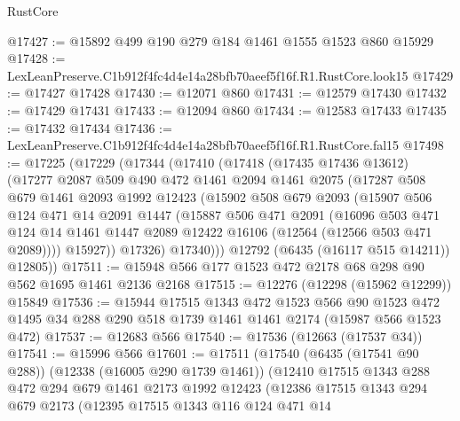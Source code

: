 \begin{lexlean}{RustCore}
\begin{coremodule}
@17427 := @15892 @499 @190 @279 @184 @1461 @1555 @1523 @860 @15929
@17428 := LexLeanPreserve.C1b912f4fc4d4e14a28bfb70aeef5f16f.R1.RustCore.look15
@17429 := @17427 @17428
@17430 := @12071 @860
@17431 := @12579 @17430
@17432 := @17429 @17431
@17433 := @12094 @860
@17434 := @12583 @17433
@17435 := @17432 @17434
@17436 := LexLeanPreserve.C1b912f4fc4d4e14a28bfb70aeef5f16f.R1.RustCore.fal15
@17498 := @17225
    (@17229
      (@17344
        (@17410
          (@17418
            (@17435 @17436 @13612)
            (@17277
              @2087
              @509
              @490
              @472
              @1461
              @2094
              @1461
              @2075
              (@17287
                @508
                @679
                @1461
                @2093
                @1992
                @12423
                (@15902
                  @508
                  @679
                  @2093
                  (@15907
                    @506
                    @124
                    @471
                    @14
                    @2091
                    @1447
                    (@15887
                      @506
                      @471
                      @2091
                      (@16096
                        @503
                        @471
                        @124
                        @14
                        @1461
                        @1447
                        @2089
                        @12422
                        @16106
                        (@12564 (@12566 @503 @471 @2089))))
                    @15927))
                @17326)
              @17340)))
        @12792
        (@6435 (@16117 @515 @14211))
        @12805))
@17511 := @15948 @566 @177 @1523 @472 @2178 @68 @298 @90 @562 @1695 @1461 @2136 @2168
@17515 := @12276 (@12298 (@15962 @12299)) @15849
@17536 := @15944
    @17515
    @1343
    @472
    @1523
    @566
    @90
    @1523
    @472
    @1495
    @34
    @288
    @290
    @518
    @1739
    @1461
    @1461
    @2174
    (@15987 @566 @1523 @472)
@17537 := @12683 @566
@17540 := @17536 (@12663 (@17537 @34))
@17541 := @15996 @566
@17601 := @17511
    (@17540
      (@6435 (@17541 @90 @288))
      (@12338 (@16005 @290 @1739 @1461))
      (@12410
        @17515
        @1343
        @288
        @472
        @294
        @679
        @1461
        @2173
        @1992
        @12423
        (@12386
          @17515
          @1343
          @294
          @679
          @2173
          (@12395
            @17515
            @1343
            @116
            @124
            @471
            @14

\end{coremodule}
\end{lexlean}
